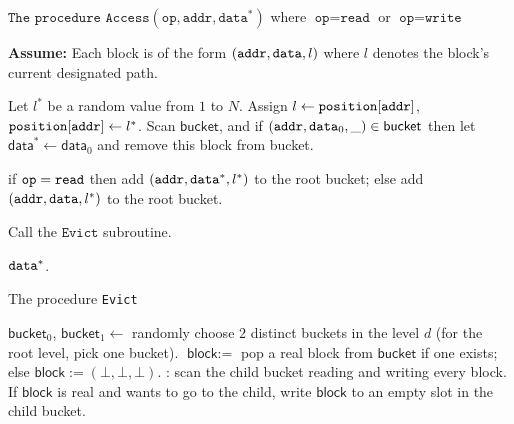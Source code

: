 \begin{algo}{$\texttt{The procedure Access}(\texttt{op}, \texttt{addr}, \texttt{data}^*)$ where $\texttt{op} = \texttt{read}$ or $\texttt{op} = \texttt{write}$}
\label{alg:access}

\textbf{Assume:}
Each block is of the form $({\texttt{addr}}, {\texttt{data}}, l)$
where $l$ denotes the block's current designated path.

\begin{algorithmic}[1]
\STATE Let $l^{*}$ be a random value from $1$ to $N$.
Assign $l \leftarrow \texttt{position}[{\texttt{addr}}]$, $\texttt{position}[{\texttt{addr}}] \leftarrow l^{*}$.
	\STATE Scan $\textsf{bucket}$, and if  
$({\texttt{addr}}, {\texttt{data}}_0, \_) \in \textsf{bucket}$ then 
let $\textsf{data}^* \leftarrow \textsf{data}_0$ and 
remove this block from \textsf{bucket}.
\ENDFOR

\STATE if ${\texttt{op}} = \texttt{read}$ then add $({\texttt{addr}}, {\texttt{data}}^*, l^*)$ to the root bucket;
else add $({\texttt{addr}}, {\texttt{data}}, l^*)$ to the root bucket.

\STATE Call the $\texttt{Evict}$ subroutine.

\RETURN ${\texttt{data}}^*$.

\end{algorithmic}
\end{algo}

\begin{algo}{The procedure \texttt{Evict}}
\label{alg:evict}
\begin{algorithmic}[1]

\STATE $\textsf{bucket}_0$, $\textsf{bucket}_1 \leftarrow$ 
randomly choose $2$ distinct buckets in the level $d$
(for the root level, pick one bucket).
\STATE 
$\textsf{block} :=$ pop a real block from $\textsf{bucket}$
if one exists; else $\textsf{block} := (\bot, \bot, \bot)$.
:
scan the child bucket reading 
and writing every block. 
If $\textsf{block}$ is real and wants to go to  
the child, write $\textsf{block}$  to an empty slot in the child bucket.
\ENDFOR
\ENDFOR
\end{algorithmic}
\end{algo}

